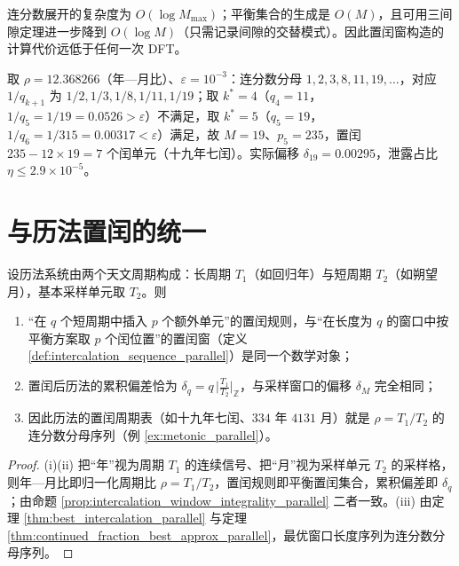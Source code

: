\begin{remark}[复杂度]\label{rem:algorithm_cost}
连分数展开的复杂度为 $O(\log M_{\max})$；平衡集合的生成是 $O(M)$，且可用三间隙定理进一步降到 $O(\log M)$（只需记录间隙的交替模式）。因此置闰窗构造的计算代价远低于任何一次 DFT。
\end{remark}

\begin{example}[算法执行示例]\label{ex:algorithm_execution}
取 $\rho=12.368266$（年—月比）、$\varepsilon=10^{-3}$：连分数分母 $1,2,3,8,11,19,\dots$，对应 $1/q_{k+1}$ 为 $1/2,1/3,1/8,1/11,1/19$；取 $k^\ast=4$（$q_4=11$，$1/q_5=1/19=0.0526>\varepsilon$）不满足，取 $k^\ast=5$（$q_5=19$，$1/q_6=1/315=0.00317<\varepsilon$）满足，故 $M=19$、$p_5=235$，置闰 $235-12\times19=7$ 个闰单元（十九年七闰）。实际偏移 $\delta_{19}=0.00295$，泄露占比 $\eta\le2.9\times10^{-5}$。
\end{example}

\section{与历法置闰的统一}\label{sec:calendar_unification}

\begin{theorem}[历法置闰与采样置闰的同构]\label{thm:calendar_sampling_unification_parallel}
设历法系统由两个天文周期构成：长周期 $T_1$（如回归年）与短周期 $T_2$（如朔望月），基本采样单元取 $T_2$。则
\begin{enumerate}[label=(\roman*)]
    \item “在 $q$ 个短周期中插入 $p$ 个额外单元”的置闰规则，与“在长度为 $q$ 的窗口中按平衡方案取 $p$ 个闰位置”的置闰窗（定义 \ref{def:intercalation_sequence_parallel}）是同一个数学对象；
    \item 置闰后历法的累积偏差恰为 $\delta_q=q\,\big|\frac{T_1}{T_2}\big|_{\mathbb{Z}}$，与采样窗口的偏移 $\delta_M$ 完全相同；
    \item 因此历法的置闰周期表（如十九年七闰、$334$ 年 $4131$ 月）就是 $\rho=T_1/T_2$ 的连分数分母序列（例 \ref{ex:metonic_parallel}）。
\end{enumerate}
\end{theorem}

\begin{proof}
(i)(ii) 把“年”视为周期 $T_1$ 的连续信号、把“月”视为采样单元 $T_2$ 的采样格，则年—月比即归一化周期比 $\rho=T_1/T_2$，置闰规则即平衡置闰集合，累积偏差即 $\delta_q$；由命题 \ref{prop:intercalation_window_integrality_parallel} 二者一致。(iii) 由定理 \ref{thm:best_intercalation_parallel} 与定理 \ref{thm:continued_fraction_best_approx_parallel}，最优窗口长度序列为连分数分母序列。
\end{proof}

